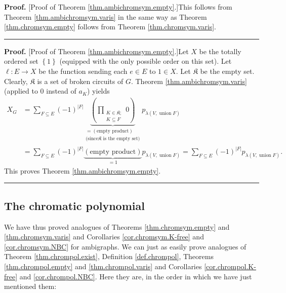 \documentclass[numbers=enddot,12pt,final,onecolumn,notitlepage]{scrartcl}%
\theoremstyle{definition}
\newenvironment{proof}[1][Proof]{\noindent\textbf{#1.} }{\ \rule{0.5em}{0.5em}}
\newenvironment{verlong}{}{}
\newenvironment{vershort}{}{}
\let\sumnonlimits\sum
\let\prodnonlimits\prod
\renewcommand{\sum}{\sumnonlimits\limits}
\renewcommand{\prod}{\prodnonlimits\limits}
\begin{document}
\begin{vershort}
\begin{proof}
[Proof of Theorem \ref{thm.ambichromsym.empty}.]This follows from Theorem
\ref{thm.ambichromsym.varis} in the same way as Theorem
\ref{thm.chromsym.empty} follows from Theorem \ref{thm.chromsym.varis}.
\end{proof}
\end{vershort}

\begin{verlong}
\begin{proof}
[Proof of Theorem \ref{thm.ambichromsym.empty}.]Let $X$ be the totally ordered
set $\left\{  1\right\}  $ (equipped with the only possible order on this
set). Let $\ell:E\rightarrow X$ be the function sending each $e\in E$ to $1\in
X$. Let $\mathfrak{K}$ be the empty set. Clearly, $\mathfrak{K}$ is a set of
broken circuits of $G$. Theorem \ref{thm.ambichromsym.varis} (applied to $0$
instead of $a_{K}$) yields%
\begin{align*}
X_{G}  &  =\sum_{F\subseteq E}\left(  -1\right)  ^{\left\vert F\right\vert
}\underbrace{\left(  \prod_{\substack{K\in\mathfrak{K};\\K\subseteq
F}}0\right)  }_{\substack{=\left(  \text{empty product}\right)  \\\text{(since
}\mathfrak{K}\text{ is the empty set)}}}p_{\lambda\left(
V,\operatorname*{union}F\right)  }\\
&  =\sum_{F\subseteq E}\left(  -1\right)  ^{\left\vert F\right\vert
}\underbrace{\left(  \text{empty product}\right)  }_{=1}p_{\lambda\left(
V,\operatorname*{union}F\right)  }=\sum_{F\subseteq E}\left(  -1\right)
^{\left\vert F\right\vert }p_{\lambda\left(  V,\operatorname*{union}F\right)
}.
\end{align*}
This proves Theorem \ref{thm.ambichromsym.empty}.
\end{proof}
\end{verlong}

\subsection{The chromatic polynomial}

We have thus proved analogues of Theorems \ref{thm.chromsym.empty} and
\ref{thm.chromsym.varis} and Corollaries \ref{cor.chromsym.K-free} and
\ref{cor.chromsym.NBC} for ambigraphs. We can just as easily prove analogues
of Theorem \ref{thm.chrompol.exist}, Definition \ref{def.chrompol}, Theorems
\ref{thm.chrompol.empty} and \ref{thm.chrompol.varis} and Corollaries
\ref{cor.chrompol.K-free} and \ref{cor.chrompol.NBC}. Here they are, in the
order in which we have just mentioned them:
\end{document}
